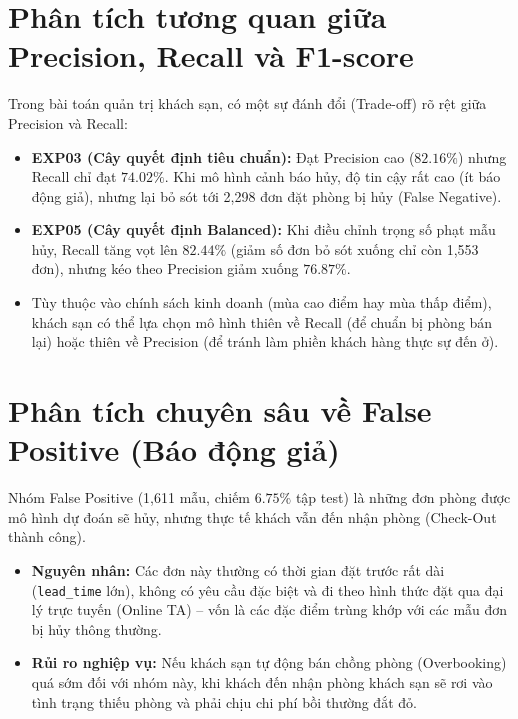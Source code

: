 \section{Phân tích tương quan giữa Precision, Recall và F1-score}
Trong bài toán quản trị khách sạn, có một sự đánh đổi (Trade-off) rõ rệt giữa Precision và Recall:
\begin{itemize}
    \item \textbf{EXP03 (Cây quyết định tiêu chuẩn):} Đạt Precision cao ($82.16\%$) nhưng Recall chỉ đạt $74.02\%$. Khi mô hình cảnh báo hủy, độ tin cậy rất cao (ít báo động giả), nhưng lại bỏ sót tới 2,298 đơn đặt phòng bị hủy (False Negative).
    \item \textbf{EXP05 (Cây quyết định Balanced):} Khi điều chỉnh trọng số phạt mẫu hủy, Recall tăng vọt lên $82.44\%$ (giảm số đơn bỏ sót xuống chỉ còn 1,553 đơn), nhưng kéo theo Precision giảm xuống $76.87\%$.
    \item Tùy thuộc vào chính sách kinh doanh (mùa cao điểm hay mùa thấp điểm), khách sạn có thể lựa chọn mô hình thiên về Recall (để chuẩn bị phòng bán lại) hoặc thiên về Precision (để tránh làm phiền khách hàng thực sự đến ở).

\end{itemize}

\section{Phân tích chuyên sâu về False Positive (Báo động giả)}
Nhóm False Positive (1,611 mẫu, chiếm $6.75\%$ tập test) là những đơn phòng được mô hình dự đoán sẽ hủy, nhưng thực tế khách vẫn đến nhận phòng (Check-Out thành công).
\begin{itemize}
    \item \textbf{Nguyên nhân:} Các đơn này thường có thời gian đặt trước rất dài (\texttt{lead\_time} lớn), không có yêu cầu đặc biệt và đi theo hình thức đặt qua đại lý trực tuyến (Online TA) -- vốn là các đặc điểm trùng khớp với các mẫu đơn bị hủy thông thường.
    \item \textbf{Rủi ro nghiệp vụ:} Nếu khách sạn tự động bán chồng phòng (Overbooking) quá sớm đối với nhóm này, khi khách đến nhận phòng khách sạn sẽ rơi vào tình trạng thiếu phòng và phải chịu chi phí bồi thường đắt đỏ.
\end{itemize}

